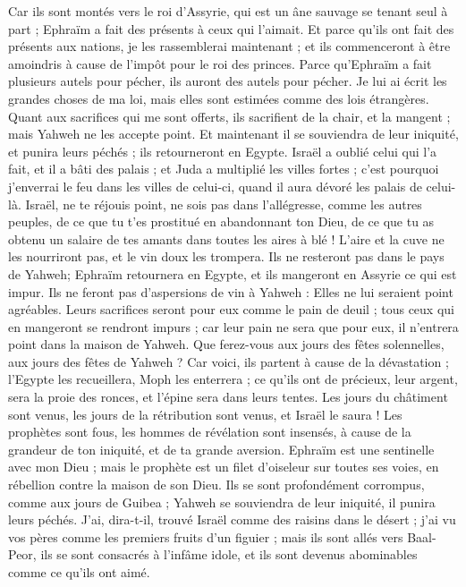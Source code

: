 \begin{multicols}{2}
Car ils sont montés vers le roi d'Assyrie, qui est un âne sauvage se tenant seul à part ; Ephraïm a fait des présents à ceux qui l'aimait.
Et parce qu'ils ont fait des présents aux nations, je les rassemblerai maintenant ; et ils commenceront à être amoindris à cause de l'impôt pour le roi des princes.
Parce qu'Ephraïm a fait plusieurs autels pour pécher, ils auront des autels pour pécher.
Je lui ai écrit les grandes choses de ma loi, mais elles sont estimées comme des lois étrangères.
Quant aux sacrifices qui me sont offerts, ils sacrifient de la chair, et la mangent ; mais Yahweh ne les accepte point. Et maintenant il se souviendra de leur iniquité, et punira leurs péchés ; ils retourneront en Egypte.
Israël a oublié celui qui l'a fait, et il a bâti des palais ; et Juda a multiplié les villes fortes ; c'est pourquoi j'enverrai le feu dans les villes de celui-ci, quand il aura dévoré les palais de celui-là.
\VerseOne{}Israël, ne te réjouis point, ne sois pas dans l'allégresse, comme les autres peuples, de ce que tu t'es prostitué en abandonnant ton Dieu, de ce que tu as obtenu un salaire de tes amants dans toutes les aires à blé !
L'aire et la cuve ne les nourriront pas, et le vin doux les trompera.
Ils ne resteront pas dans le pays de Yahweh; Ephraïm retournera en Egypte, et ils mangeront en Assyrie ce qui est impur.
Ils ne feront pas d'aspersions de vin à Yahweh : Elles ne lui seraient point agréables. Leurs sacrifices seront pour eux comme le pain de deuil ; tous ceux qui en mangeront se rendront impurs ; car leur pain ne sera que pour eux, il n'entrera point dans la maison de Yahweh.
Que ferez-vous aux jours des fêtes solennelles, aux jours des fêtes de Yahweh ?
Car voici, ils partent à cause de la dévastation ; l'Egypte les recueillera, Moph les enterrera ; ce qu'ils ont de précieux, leur argent, sera la proie des ronces, et l'épine sera dans leurs tentes.
Les jours du châtiment sont venus, les jours de la rétribution sont venus, et Israël le saura ! Les prophètes sont fous, les hommes de révélation sont insensés, à cause de la grandeur de ton iniquité, et de ta grande aversion.
Ephraïm est une sentinelle avec mon Dieu ; mais le prophète est un filet d'oiseleur sur toutes ses voies, en rébellion contre la maison de son Dieu.
Ils se sont profondément corrompus, comme aux jours de Guibea ; Yahweh se souviendra de leur iniquité, il punira leurs péchés.
J'ai, dira-t-il, trouvé Israël comme des raisins dans le désert ; j'ai vu vos pères comme les premiers fruits d'un figuier ; mais ils sont allés vers Baal-Peor, ils se sont consacrés à l'infâme idole, et ils sont devenus abominables comme ce qu'ils ont aimé.

\end{multicols}
